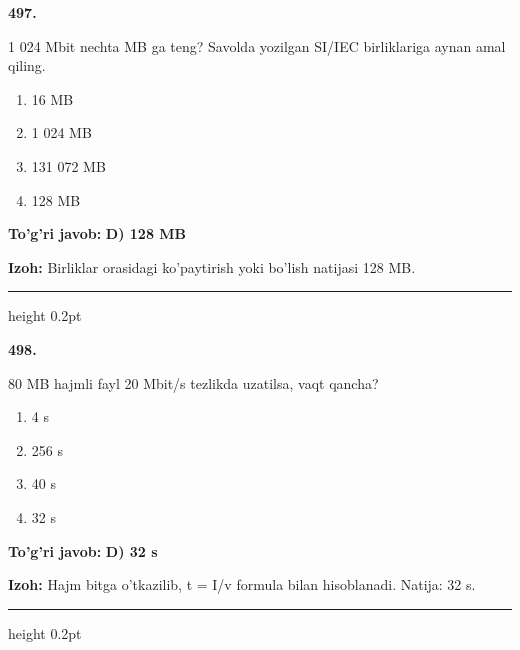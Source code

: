 \documentclass[10pt,a4paper,oneside]{article}
\begin{document}
\noindent\textbf{\color{ink}497.}
\par
1 024 Mbit nechta MB ga teng? Savolda yozilgan SI/IEC birliklariga aynan amal qiling.
\begin{enumerate}[label=\Alph*),leftmargin=9mm]
\item 16 MB
\item 1 024 MB
\item 131 072 MB
\item 128 MB
\end{enumerate}
\begin{tcolorbox}[enhanced,breakable,colback=teal!4,colframe=teal!50!black,boxrule=0.5pt,arc=1.1mm,left=3mm,right=3mm,top=1.7mm,bottom=1.7mm,before skip=2mm,after skip=2mm]
\textbf{\color{teal}To'g'ri javob:} \textbf{D) 128 MB}
\par\smallskip
\textbf{Izoh:} Birliklar orasidagi ko'paytirish yoki bo'lish natijasi 128 MB.
\end{tcolorbox}
\vspace{2mm}\hrule height 0.2pt \vspace{3mm}

\noindent\textbf{\color{ink}498.}
\par
80 MB hajmli fayl 20 Mbit/s tezlikda uzatilsa, vaqt qancha?
\begin{enumerate}[label=\Alph*),leftmargin=9mm]
\item 4 s
\item 256 s
\item 40 s
\item 32 s
\end{enumerate}
\begin{tcolorbox}[enhanced,breakable,colback=teal!4,colframe=teal!50!black,boxrule=0.5pt,arc=1.1mm,left=3mm,right=3mm,top=1.7mm,bottom=1.7mm,before skip=2mm,after skip=2mm]
\textbf{\color{teal}To'g'ri javob:} \textbf{D) 32 s}
\par\smallskip
\textbf{Izoh:} Hajm bitga o'tkazilib, t = I/v formula bilan hisoblanadi. Natija: 32 s.
\end{tcolorbox}
\vspace{2mm}\hrule height 0.2pt \vspace{3mm}
\end{document}
